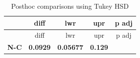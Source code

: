 \documentclass[]{article}
\begin{document}
\begin{longtable}[]{@{}ccccc@{}}
\caption{Posthoc comparisons using Tukey HSD}\tabularnewline
\toprule
\begin{minipage}[b]{0.13\columnwidth}\centering\strut
~\strut
\end{minipage} & \begin{minipage}[b]{0.16\columnwidth}\centering\strut
diff\strut
\end{minipage} & \begin{minipage}[b]{0.16\columnwidth}\centering\strut
lwr\strut
\end{minipage} & \begin{minipage}[b]{0.16\columnwidth}\centering\strut
upr\strut
\end{minipage} & \begin{minipage}[b]{0.16\columnwidth}\centering\strut
p adj\strut
\end{minipage}\tabularnewline
\midrule
\endfirsthead
\toprule
\begin{minipage}[b]{0.13\columnwidth}\centering\strut
~\strut
\end{minipage} & \begin{minipage}[b]{0.16\columnwidth}\centering\strut
diff\strut
\end{minipage} & \begin{minipage}[b]{0.16\columnwidth}\centering\strut
lwr\strut
\end{minipage} & \begin{minipage}[b]{0.16\columnwidth}\centering\strut
upr\strut
\end{minipage} & \begin{minipage}[b]{0.16\columnwidth}\centering\strut
p adj\strut
\end{minipage}\tabularnewline
\midrule
\endhead
\begin{minipage}[t]{0.13\columnwidth}\centering\strut
\textbf{N-C}\strut
\end{minipage} & \begin{minipage}[t]{0.16\columnwidth}\centering\strut
\textbf{0.0929}\strut
\end{minipage} & \begin{minipage}[t]{0.16\columnwidth}\centering\strut
\textbf{0.05677}\strut
\end{minipage} & \begin{minipage}[t]{0.16\columnwidth}\centering\strut
\textbf{0.129}\strut
\end{minipage} & \begin{minipage}[t]{0.16\columnwidth}\centering\strut

\end{minipage}
\end{longtable}
\end{document}
